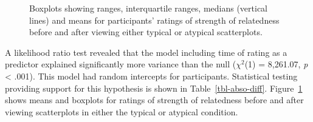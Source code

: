 \documentclass[manuscript,screen,review]{acmart}
\begin{document}
\begin{table}

\caption{\label{tbl-abso-diff}Statistics for the significant main effect
of rating time. Semi-partial R\textsuperscript{2} is also incuded.}


\end{table}%

\begin{figure}


\caption{\label{fig-abso-descriptives}Boxplots showing ranges,
interquartile ranges, medians (vertical lines) and means for
participants' ratings of strength of relatedness before and after
viewing either typical or atypical scatterplots.}

\end{figure}%

A likelihood ratio test revealed that the model including time of rating
as a predictor explained significantly more variance than the null
(\(\chi^2\)(1) = 8,261.07, \emph{p} \textless{} .001). This model had
random intercepts for participants. Statistical testing providing
support for this hypothesis is shown in Table~\ref{tbl-abso-diff}.
Figure~\ref{fig-abso-descriptives} shows means and boxplots for ratings
of strength of relatedness before and after viewing scatterplots in
either the typical or atypical condition.
\end{document}
